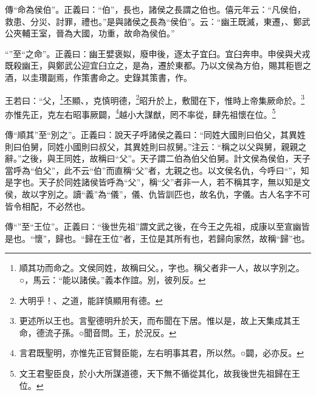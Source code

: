 {\noindent\zhuan{}\fzbyks 傳“命為侯伯”。正義曰：“伯”，長也，諸侯之長謂之伯也。僖元年云：“凡侯伯，救患、分災、討罪，禮也。”是與諸侯之長為“侯伯”。云：“幽王既滅，東遷，、鄭武公夾輔王室，晉為大國，功重，故命為侯伯。” \par}

{\noindent\shu{}\fzkt “”至“之命”。正義曰：幽王嬖褒姒，廢申後，逐太子宜臼。宜臼奔申。申侯與犬戎既殺幽王，與鄭武公迎宜臼立之，是為，遷於東都。乃以文侯為方伯，賜其秬鬯之酒，以圭瓚副焉，作策書命之。史錄其策書，作。 \par}

王若曰：“父，\footnote{順其功而命之。文侯同姓，故稱曰父。，字也。稱父者非一人，故以字別之。○，馬云：“能以諸侯。”義本作誼。別，彼列反。}丕顯、，克慎明德，\footnote{大明乎！、之道，能詳慎顯用有德。}昭升於上，敷聞在下，惟時上帝集厥命於。\footnote{更述所以王也。言聖德明升於天，而布聞在下居。惟以是，故上天集成其王命，德流子孫。○聞音問。王，於況反。}亦惟先正，克左右昭事厥闢，\footnote{言君既聖明，亦惟先正官賢臣能，左右明事其君，所以然。○闢，必亦反。}越小大謀猷，罔不率從，肆先祖懷在位。\footnote{文王君聖臣良，於小大所謀道德，天下無不循從其化，故我後世先祖歸在王位。}


{\noindent\zhuan{}\fzbyks 傳“順其”至“別之”。正義曰：說天子呼諸侯之義曰：“同姓大國則曰伯父，其異姓則曰伯舅，同姓小國則曰叔父，其異姓則曰叔舅。”注云：“稱之以父與舅，親親之辭。”之後，與王同姓，故稱曰“父”。天子謂二伯為伯父伯舅。計文侯為侯伯，天子當呼為“伯父”，此不云“伯”而直稱“父”者，尢親之也。以文侯名仇，今呼曰“”，知是字也。天子於同姓諸侯皆呼為“父”，稱“父”者非一人，若不稱其字，無以知是文侯，故以字別之。讀“義”為“儀”，儀、仇皆訓匹也，故名仇，字儀。古人名字不可皆令相配，不必然也。 \par}

{\noindent\zhuan{}\fzbyks 傳“”至“王位”。正義曰：“後世先祖”謂文武之後，在今王之先祖，成康以至宣幽皆是也。“懷”，歸也。“歸在王位”者，王位是其所有也，若歸向家然，故稱“歸”也。 \par}

